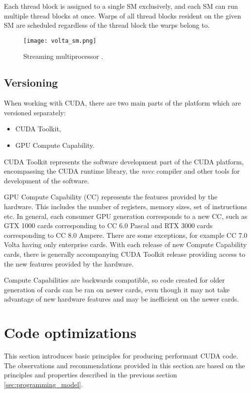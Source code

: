 Each thread block is assigned to a single SM exclusively, and each SM can run multiple thread blocks at once. Warps of all thread blocks resident on the given SM are scheduled regardless of the thread block the warps belong to.


\begin{figure}[h]
	\centering
	\texttt{[image: volta\_sm.png]}
	\caption{Streaming multiprocessor \citep{paper:volta}.}
	\label{fig:volta_sm}
\end{figure}

\subsection{Versioning}

When working with CUDA, there are two main parts of the platform which are versioned separately: %
\begin{itemize}
	\item CUDA Toolkit,
	\item GPU Compute Capability.
\end{itemize}

CUDA Toolkit represents the software development part of the CUDA platform, encompassing the CUDA runtime library, the \textit{nvcc} compiler and other tools for development of the software.

GPU Compute Capability (CC) represents the features provided by the hardware. This includes the number of registers, memory sizes, set of instructions etc. In general, each consumer GPU generation corresponds to a new CC, such as GTX 1000 cards corresponding to CC 6.0 Pascal and RTX 3000 cards corresponding to CC 8.0 Ampere. There are some exceptions, for example CC 7.0 Volta having only enterprise cards. With each release of new Compute Capability cards, there is generally accompanying CUDA Toolkit release providing access to the new features provided by the hardware. 

Compute Capabilities are backwards compatible, so code created for older generation of cards can be ran on newer cards, even though it may not take advantage of new hardware features and may be inefficient on the newer cards.

\section{Code optimizations}

This section introduces basic principles for producing performant CUDA code.
The observations and recommendations provided in this section are based on the principles and properties described in the previous section \ref{sec:programming_model}.

